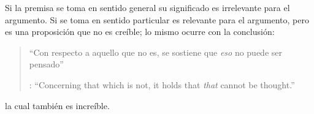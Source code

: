 Si la premisa se toma en sentido general su significado es irrelevante para el argumento. Si se toma en sentido particular es relevante para el argumento, pero es una proposición que no es creíble; lo mismo ocurre con la conclusión: \blockquote[{\cite[3]{anscombe1981parmenides:pmc}}: \enquote{Concerning that which is not, it holds that \emph{that} cannot be thought.}]{\enquote{Con respecto a aquello que no es, se sostiene que \emph{eso} no puede ser pensado}}. la cual también es increíble.

